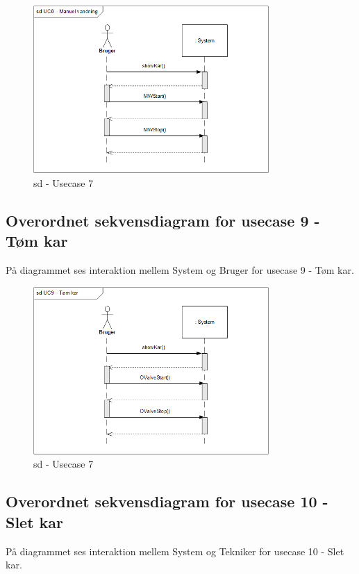 \begin{figure}[H]
    \centering
    \includegraphics[width=0.8\textwidth]{Systemarkitektur/OverordnedeSekvensdiagrammer/sd_UC8.PNG}
    \caption{sd - Usecase 7}
    \label{fig:sd_UC6}
\end{figure}

\subsection*{Overordnet sekvensdiagram for usecase 9 - Tøm kar}
På diagrammet ses interaktion mellem System og Bruger for usecase 9 - Tøm kar.

\begin{figure}[H]
    \centering
    \includegraphics[width=0.8\textwidth]{Systemarkitektur/OverordnedeSekvensdiagrammer/sd_UC9.PNG}
    \caption{sd - Usecase 7}
    \label{fig:sd_UC6}
\end{figure}

\subsection*{Overordnet sekvensdiagram for usecase 10 - Slet kar}
På diagrammet ses interaktion mellem System og Tekniker for usecase 10 - Slet kar.

